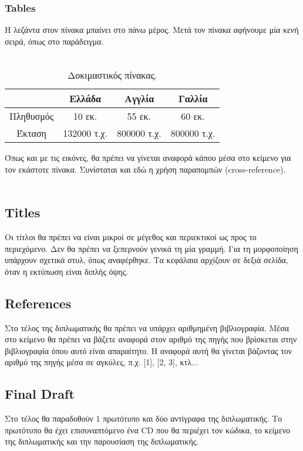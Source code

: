 \subsubsection{Tables}

\begin{flushleft}
    Η λεζάντα στον πίνακα μπαίνει στο πάνω μέρος. Μετά τον πίνακα αφήνουμε μία κενή σειρά, όπως στο παράδειγμα.  \\~\\
    
    \begin{table}
        \centering
        \renewcommand\tablename{Πίνακας}
        \caption{\label{tab:table-name}Δοκιμαστικός πίνακας. }
        \begin{tabular}{|c|c|c|c|}
         \hline
          & Ελλάδα & Αγγλία & Γαλλία\\
         \hline\hline
         Πληθυσμός & 10 εκ.  & 55 εκ. & 60 εκ. \\ 
         \hline
         Έκταση & 132000 τ.χ. & 800000 τ.χ. & 800000 τ.χ. \\
         \hline
        \end{tabular}
    \end{table}
    
    Όπως και με τις εικόνες, θα πρέπει να γίνεται αναφορά κάπου μέσα στο κείμενο για τον εκάστοτε πίνακα. Συνίσταται και εδώ η χρήση παραπομπών (cross-reference). \\~\\
\end{flushleft}

\subsection{Titles}

\begin{flushleft}
    Οι τίτλοι θα πρέπει να είναι μικροί σε μέγεθος και περιεκτικοί ως προς το περιεχόμενο. Δεν θα πρέπει να ξεπερνούν γενικά τη μία γραμμή. Για τη μορφοποίηση υπάρχουν σχετικά στυλ, όπως αναφέρθηκε. Τα κεφάλαια αρχίζουν σε δεξιά σελίδα, όταν η εκτύπωση είναι διπλής όψης. 
\end{flushleft}

\subsection{References}

\begin{flushleft}
    Στο τέλος της διπλωματικής θα πρέπει να υπάρχει αριθμημένη βιβλιογραφία. Μέσα στο κείμενο θα πρέπει να βάζετε αναφορά στον αριθμό της πηγής που βρίσκεται στην βιβλιογραφία όπου αυτό είναι απαραίτητο. Η αναφορά αυτή θα γίνεται βάζοντας τον αριθμό της πηγής μέσα σε αγκύλες, π.χ. [1], [2, 3], κτλ... 
\end{flushleft}

\subsection{Final Draft}

\begin{flushleft}
    Στο τέλος θα παραδοθούν 1 πρωτότυπο και δύο αντίγραφα της διπλωματικής. Το πρωτότυπο θα έχει επισυναπτόμενο ένα CD που θα περιέχει τον κώδικα, το κείμενο της διπλωματικής και την παρουσίαση της διπλωματικής. 
\end{flushleft}